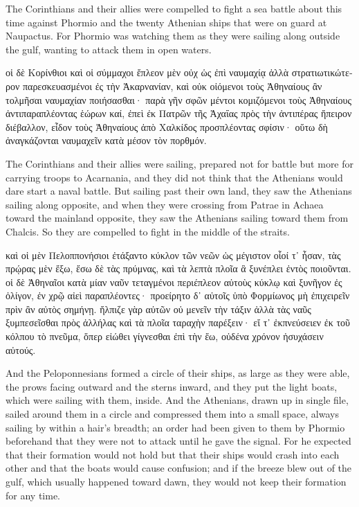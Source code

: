 \documentclass{article}
\begin{document}
The Corinthians and their allies were compelled to fight a sea battle about this time
against Phormio and the twenty Athenian ships that were on guard at Naupactus.
For Phormio was watching them as they were sailing along outside the gulf,
wanting to attack them in open waters. \\


\begin{greek}
οἱ δὲ Κορίνθιοι καὶ οἱ σύμμαχοι ἔπλεον μὲν οὐχ ὡς ἐπὶ ναυμαχίᾳ
ἀλλὰ στρατιωτικώτερον παρεσκευασμένοι ἐς τὴν Ἀκαρνανίαν,
καὶ οὐκ οἰόμενοι τοὺς Ἀθηναίους ἂν τολμῆσαι ναυμαχίαν ποιήσασθαι·
παρὰ γῆν σφῶν μέντοι κομιζόμενοι τοὺς Ἀθηναίους ἀντιπαραπλέοντας ἑώρων καί,
ἐπεὶ ἐκ Πατρῶν τῆς Ἀχαΐας πρὸς τὴν ἀντιπέρας ἤπειρον διέβαλλον,
εἶδον τοὺς Ἀθηναίους ἀπὸ Χαλκίδος προσπλέοντας σφίσιν·
οὕτω δὴ ἀναγκάζονται ναυμαχεῖν κατὰ μέσον τὸν πορθμόν. \\
\end{greek}


The Corinthians and their allies were sailing,
prepared not for battle but more for carrying troops to Acarnania,
and they did not think that the Athenians would dare start a naval battle.
But sailing past their own land, they saw the Athenians sailing along opposite,
and when they were crossing from Patrae in Achaea toward the mainland opposite,
they saw the Athenians sailing toward them from Chalcis.
So they are compelled to fight in the middle of the straits. \\ %


\begin{greek}
καὶ οἱ μὲν Πελοππονήσιοι ἐτάξαντο κύκλον τῶν νεῶν ὡς μέγιστον οἷοί τ᾿ ἦσαν,
τὰς πρῴρας μὲν ἔξω, ἔσω δὲ τὰς πρύμνας, καὶ τὰ λεπτὰ πλοῖα ἃ ξυνέπλει ἐντὸς ποιοῦνται.
οἱ δὲ Ἀθηναῖοι κατὰ μίαν ναῦν τεταγμένοι περιέπλεον αὐτοὺς κύκλῳ καὶ ξυνῆγον ἐς ὀλίγον,
ἐν χρῷ αἰεὶ παραπλέοντες·
προείρητο δ᾿ αὐτοῖς ὑπὸ Φορμίωνος μὴ ἐπιχειρεῖν πρὶν ἂν αὐτὸς σημήνῃ.
ἤλπιζε γὰρ αὐτῶν οὐ μενεῖν τὴν τάξιν ἀλλὰ τὰς ναῦς ξυμπεσεῖσθαι πρὸς ἀλλήλας
καὶ τὰ πλοῖα ταραχὴν παρέξειν· εἴ τ᾿ ἐκπνεύσειεν ἐκ τοῦ κόλπου τὸ πνεῦμα,
ὅπερ εἰώθει γίγνεσθαι ἐπὶ τὴν ἕω, οὐδένα χρόνον ἡσυχάσειν αὐτούς. \\
\end{greek}



And the Peloponnesians formed a circle of their ships, as large as they were able,
the prows facing outward and the sterns inward, and they put the light boats,
which were sailing with them, inside.
And the Athenians, drawn up in single file, sailed around them in a circle
and compressed them into a small space, always sailing by within a hair's breadth;
an order had been given to them by Phormio beforehand that they were not to attack until he gave the signal.
For he expected that their formation would not hold
but that their ships would crash into each other and that the boats would cause confusion;
and if the breeze blew out of the gulf, which usually happened toward dawn,
they would not keep their formation for any time. \\ %
\end{document}
